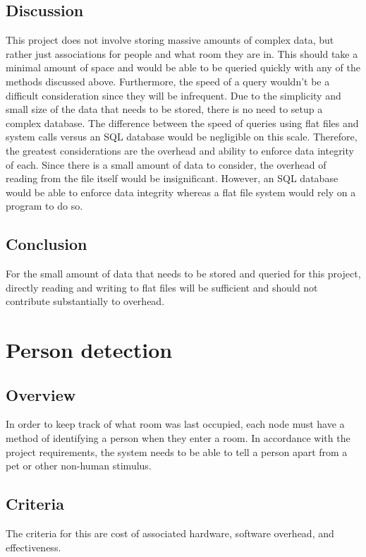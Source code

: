 \documentclass[onecolumn, draftclsnofoot,10pt, compsoc]{IEEEtran}
\begin{document}
\subsection{Discussion}
This project does not involve storing massive amounts of complex data, but rather just associations for people and what room they are in. This should take a minimal amount of space and would be able to be queried quickly with any of the methods discussed above. Furthermore, the speed of a query wouldn’t be a difficult consideration since they will be infrequent. Due to the simplicity and small size of the data that needs to be stored, there is no need to setup a complex database. The difference between the speed of queries using flat files and system calls versus an SQL database would be negligible on this scale. Therefore, the greatest considerations are the overhead and ability to enforce data integrity of each. Since there is a small amount of data to consider, the overhead of reading from the file itself would be insignificant. However, an SQL database would be able to enforce data integrity whereas a flat file system would rely on a program to do so. 


\subsection{Conclusion}
For the small amount of data that needs to be stored and queried for this project, directly reading and writing to flat files will be sufficient and should not contribute substantially to overhead.







\section{Person detection}
\subsection{Overview}
In order to keep track of what room was last occupied, each node must have a method of identifying a person when they enter a room. In accordance with the project requirements, the system needs to be able to tell a person apart from a pet or other non-human stimulus.

\subsection{Criteria}
The criteria for this are cost of associated hardware, software overhead, and effectiveness. 
\end{document}
